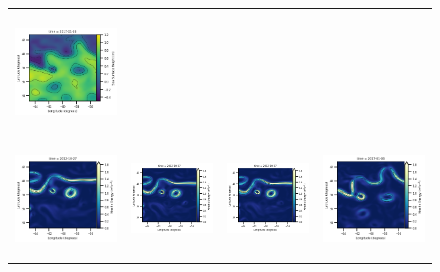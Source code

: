 \begin{figure}[ht!]
\begin{center}
\begin{tabular}{cccc}
\includegraphics[trim={13mm 13mm 0 0},clip,width=4.0cm,height=3.2cm]{00_Oceanbench/content/figures/fourdvarnet_figs/ose_gf_ssh.png} \\
\includegraphics[trim={0 13mm 22mm 5mm}, clip, width=3.60cm,height=3cm]{00_Oceanbench/content/figures/fourdvarnet_figs/osse_gf_nadir_ke.png} &
\includegraphics[trim={13mm 13mm 22mm 5mm},clip, width=3.2cm,height=3cm]{00_Oceanbench/content/figures/fourdvarnet_figs/osse_gf_nadirswot_ke.png} &
\includegraphics[trim={13mm 13mm 22mm 5mm},clip, width=3.2cm,height=3cm]{00_Oceanbench/content/figures/fourdvarnet_figs/osse_gf_nadir_sst_ke.png} &
\includegraphics[trim={13mm 13mm 0 5mm},clip,width=4cm,height=3cm]{00_Oceanbench/content/figures/fourdvarnet_figs/ose_gf_ke.png} \\

\end{tabular}
\end{center}
\end{figure}
